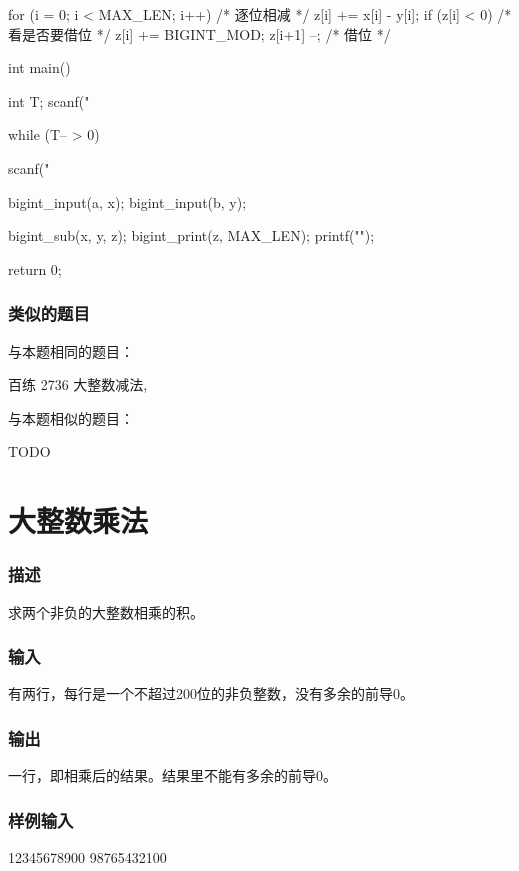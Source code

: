 \begin{Codex}[label=bigint_sub.c]
{    for (i = 0; i < MAX_LEN; i++) {  /* 逐位相减 */
        z[i] += x[i] - y[i];
        if (z[i] < 0) {  /* 看是否要借位 */
            z[i] += BIGINT_MOD;
            z[i+1] --;  /* 借位 */
        }
    }
}

int main() {
    int T;    
    scanf("%

    while (T-- > 0) {
        scanf("%

        bigint_input(a, x);
        bigint_input(b, y);

        bigint_sub(x, y, z);
        bigint_print(z, MAX_LEN);
        printf("\n"); 
    }
    return 0;
}
\end{Codex}

\subsubsection{类似的题目}
与本题相同的题目：
\begindot
\item 百练 2736 大整数减法, 
\myenddot

与本题相似的题目：
\begindot
\item  TODO
\myenddot


\section{大整数乘法} %
\label{sec:bigintmul}
\subsubsection{描述}
求两个非负的大整数相乘的积。

\subsubsection{输入}
有两行，每行是一个不超过200位的非负整数，没有多余的前导0。 

\subsubsection{输出}
一行，即相乘后的结果。结果里不能有多余的前导0。 

\subsubsection{样例输入}
\begin{Code}
12345678900
98765432100
\end{Code}

